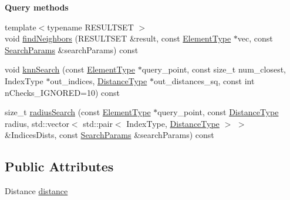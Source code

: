 \begin{Indent}{\bf Query methods}\par
\begin{DoxyCompactItemize}
\item 
{\footnotesize template$<$typename R\-E\-S\-U\-L\-T\-S\-E\-T $>$ }\\void \hyperlink{classnanoflann_1_1_k_d_tree_single_index_adaptor_a1b73cef78437060cec2629810608d63e}{find\-Neighbors} (R\-E\-S\-U\-L\-T\-S\-E\-T \&result, const \hyperlink{classnanoflann_1_1_k_d_tree_single_index_adaptor_a21652a3919382d558291f80cefad8770}{Element\-Type} $\ast$vec, const \hyperlink{structnanoflann_1_1_search_params}{Search\-Params} \&search\-Params) const 
\item 
void \hyperlink{classnanoflann_1_1_k_d_tree_single_index_adaptor_acf404828507288cf6302ced33bdc45bb}{knn\-Search} (const \hyperlink{classnanoflann_1_1_k_d_tree_single_index_adaptor_a21652a3919382d558291f80cefad8770}{Element\-Type} $\ast$query\-\_\-point, const size\-\_\-t num\-\_\-closest, Index\-Type $\ast$out\-\_\-indices, \hyperlink{classnanoflann_1_1_k_d_tree_single_index_adaptor_addc764e7c19cc85c89b3903338e5a910}{Distance\-Type} $\ast$out\-\_\-distances\-\_\-sq, const int n\-Checks\-\_\-\-I\-G\-N\-O\-R\-E\-D=10) const 
\item 
size\-\_\-t \hyperlink{classnanoflann_1_1_k_d_tree_single_index_adaptor_afcaab7169b54103fcb37c6ad02ec44f7}{radius\-Search} (const \hyperlink{classnanoflann_1_1_k_d_tree_single_index_adaptor_a21652a3919382d558291f80cefad8770}{Element\-Type} $\ast$query\-\_\-point, const \hyperlink{classnanoflann_1_1_k_d_tree_single_index_adaptor_addc764e7c19cc85c89b3903338e5a910}{Distance\-Type} radius, std\-::vector$<$ std\-::pair$<$ Index\-Type, \hyperlink{classnanoflann_1_1_k_d_tree_single_index_adaptor_addc764e7c19cc85c89b3903338e5a910}{Distance\-Type} $>$ $>$ \&Indices\-Dists, const \hyperlink{structnanoflann_1_1_search_params}{Search\-Params} \&search\-Params) const 
\end{DoxyCompactItemize}
\end{Indent}
\subsection*{Public Attributes}
\begin{DoxyCompactItemize}
\item 
Distance \hyperlink{classnanoflann_1_1_k_d_tree_single_index_adaptor_a264f86796d4cae73878b594155e9a807}{distance}
\end{DoxyCompactItemize}
